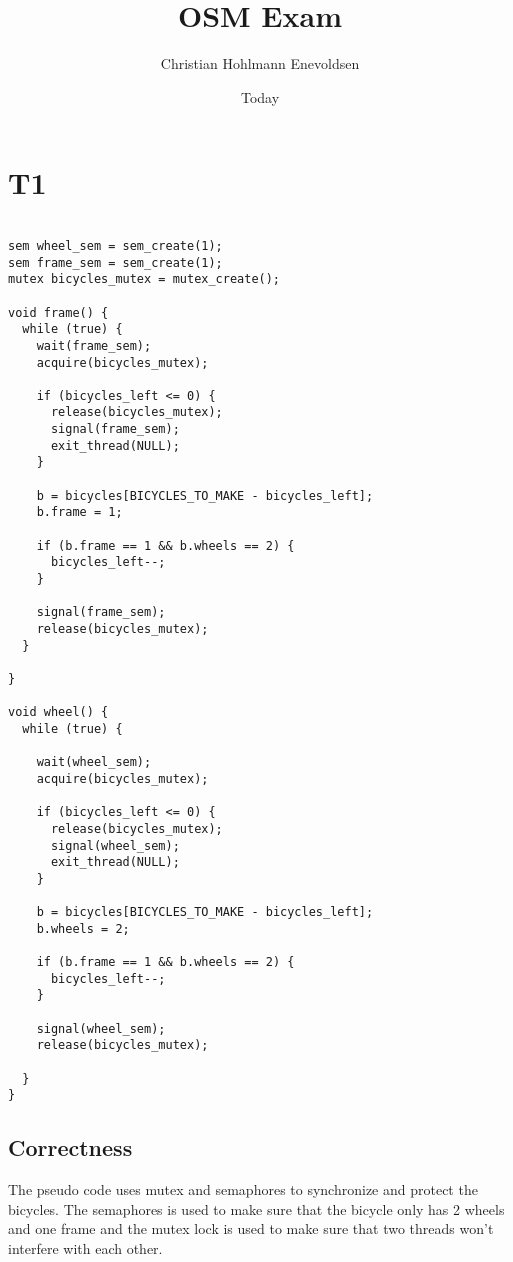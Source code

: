 \documentclass[]{article}
\begin{document}
\title{OSM Exam}
\author{Christian Hohlmann Enevoldsen}
\date{Today}
\maketitle


\section*{T1}

\begin{lstlisting}[label=bicycle-code,caption=Bicycle Factory]

sem wheel_sem = sem_create(1);
sem frame_sem = sem_create(1);
mutex bicycles_mutex = mutex_create();

void frame() {
  while (true) {
    wait(frame_sem);
    acquire(bicycles_mutex);

    if (bicycles_left <= 0) {
      release(bicycles_mutex);
      signal(frame_sem);
      exit_thread(NULL);
    }

    b = bicycles[BICYCLES_TO_MAKE - bicycles_left];
    b.frame = 1;

    if (b.frame == 1 && b.wheels == 2) {
      bicycles_left--;
    }

    signal(frame_sem);
    release(bicycles_mutex);
  }

}

void wheel() {
  while (true) {

    wait(wheel_sem);
    acquire(bicycles_mutex);

    if (bicycles_left <= 0) {
      release(bicycles_mutex);
      signal(wheel_sem);
      exit_thread(NULL);
    }

    b = bicycles[BICYCLES_TO_MAKE - bicycles_left];
    b.wheels = 2;

    if (b.frame == 1 && b.wheels == 2) {
      bicycles_left--;
    }

    signal(wheel_sem);
    release(bicycles_mutex);
    
  }
}

\end{lstlisting}


\vspace{2 mm}

\subsection*{Correctness}

The pseudo code uses mutex and semaphores to synchronize and protect the bicycles. The semaphores is used to make sure that the bicycle only has 2 wheels and one frame and the mutex lock is used to make sure that two threads won't interfere with each other.
\end{document}
